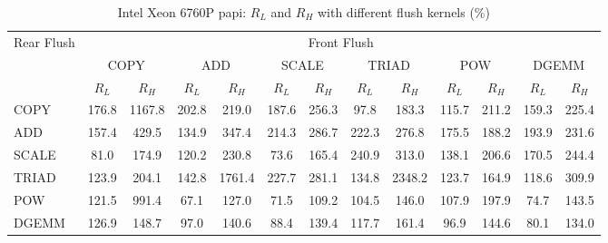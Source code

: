 \begin{table}[htbp]
\centering
\caption{Intel Xeon 6760P papi: $R_L$ and $R_H$ with different flush kernels (\%)}
\label{tab:frkern-cgnr6760pn2-papi}
\begin{tabular*}{\textwidth}{@{\extracolsep{\fill}}lcccccccccccc}
\toprule
\multirow{3}{*}{Rear Flush} & \multicolumn{12}{c}{Front Flush} \\ \cmidrule(lr){2-13}
& \multicolumn{2}{c}{COPY} & \multicolumn{2}{c}{ADD} & \multicolumn{2}{c}{SCALE} & \multicolumn{2}{c}{TRIAD} & \multicolumn{2}{c}{POW} & \multicolumn{2}{c}{DGEMM} \\ \cmidrule(lr){2-3} \cmidrule(lr){4-5} \cmidrule(lr){6-7} \cmidrule(lr){8-9} \cmidrule(lr){10-11} \cmidrule(lr){12-13}
& $R_L$ & $R_H$ & $R_L$ & $R_H$ & $R_L$ & $R_H$ & $R_L$ & $R_H$ & $R_L$ & $R_H$ & $R_L$ & $R_H$ \\ \midrule
COPY & 176.8 & 1167.8 & 202.8 & 219.0 & 187.6 & 256.3 & 97.8 & 183.3 & 115.7 & 211.2 & 159.3 & 225.4 \\
ADD & 157.4 & 429.5 & 134.9 & 347.4 & 214.3 & 286.7 & 222.3 & 276.8 & 175.5 & 188.2 & 193.9 & 231.6 \\
SCALE & 81.0 & 174.9 & 120.2 & 230.8 & 73.6 & 165.4 & 240.9 & 313.0 & 138.1 & 206.6 & 170.5 & 244.4 \\
TRIAD & 123.9 & 204.1 & 142.8 & 1761.4 & 227.7 & 281.1 & 134.8 & 2348.2 & 123.7 & 164.9 & 118.6 & 309.9 \\
POW & 121.5 & 991.4 & 67.1 & 127.0 & 71.5 & 109.2 & 104.5 & 146.0 & 107.9 & 197.9 & 74.7 & 143.5 \\
DGEMM & 126.9 & 148.7 & 97.0 & 140.6 & 88.4 & 139.4 & 117.7 & 161.4 & 96.9 & 144.6 & 80.1 & 134.0 \\
\bottomrule
\end{tabular*}
\end{table}
